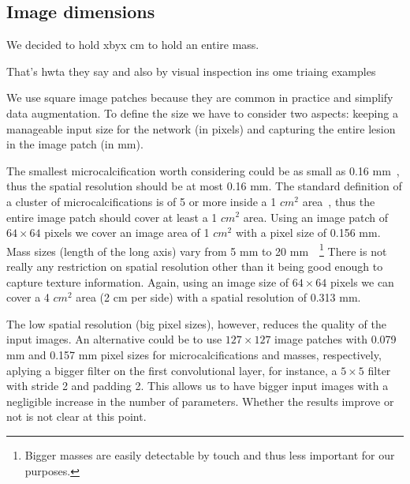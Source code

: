 \subsection{Image dimensions}
We decided to hold xbyx cm to hold an entire mass.

That's hwta they say and also by visual inspection ins ome triaing examples


We use square image patches because they are common in practice and simplify data augmentation. To define the size we have to consider two aspects: keeping a manageable input size for the network (in pixels) and capturing the entire lesion in the image patch (in mm).

The smallest microcalcification worth considering could be as small as 0.16 mm~\cite{Lo1998}, thus the spatial resolution should be at most 0.16 mm. The standard definition of a cluster of microcalcifications is of 5 or more inside a 1 $cm^2$ area~\cite{Sickles2013}, thus the entire image patch should cover at least a 1 $cm^2$ area. Using an image patch of $64  \times 64$ pixels we cover an image area of 1 $cm^2$ with a pixel size of 0.156 mm. 
Mass sizes (length of the long axis) vary from 5 mm to 20 mm~\cite{Sahiner1996}~\footnote{Bigger masses are easily detectable by touch and thus less important for our purposes.} There is not really any restriction on spatial resolution other than it being good enough to capture texture information. Again, using an image size of $64 \times 64$ pixels we can cover a 4 $cm^2$ area (2 cm per side) with a spatial resolution of 0.313 mm.

The low spatial resolution (big pixel sizes), however, reduces the quality of the input images. An alternative could be to use $127 \times 127$ image patches with 0.079 mm and 0.157 mm pixel sizes for microcalcifications and masses, respectively, aplying a bigger filter on the first convolutional layer, for instance, a $5 \times 5$ filter with stride 2 and padding 2. This allows us to have bigger input images with a negligible increase in the number of parameters. Whether the results improve or not is not clear at this point.

